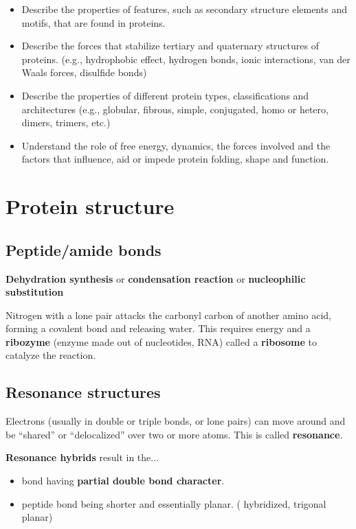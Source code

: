 \documentclass[letterpaper, 12pt]{article}
\begin{document}
\begin{itemize}
\item Describe the properties of features, such as secondary structure elements and motifs, that are found in proteins.
\item Describe the forces that stabilize tertiary and quaternary structures of proteins. (e.g., hydrophobic effect, hydrogen bonds, ionic interactions, van der Waals forces, disulfide bonds)
\item Describe the properties of different protein types, classifications and architectures (e.g., globular, fibrous, simple, conjugated, homo or hetero, dimers, trimers, etc.)
\item Understand the role of free energy, dynamics, the forces involved and the factors that influence, aid or impede protein folding, shape and function.
\end{itemize}

\newpage

\section*{Protein structure}

\subsection*{Peptide/amide bonds}

\textbf{Dehydration synthesis} or \textbf{condensation reaction} or \textbf{nucleophilic substitution}

Nitrogen with a lone pair attacks the carbonyl carbon of another amino acid, forming a covalent bond and releasing water. This requires energy and a \textbf{ribozyme} (enzyme made out of nucleotides, RNA) called a \textbf{ribosome} to catalyze the reaction.

\subsection*{Resonance structures}

Electrons (usually in double or triple bonds, or lone pairs) can move around
and be ``shared'' or ``delocalized'' over two or more atoms. This is called \textbf{resonance}.

\textbf{Resonance hybrids} result in the...

\begin{itemize}
\item {} bond having \textbf{partial double bond character}.
\item peptide bond being shorter and essentially planar. ( hybridized, trigonal planar)
\end{itemize}
\end{document}

